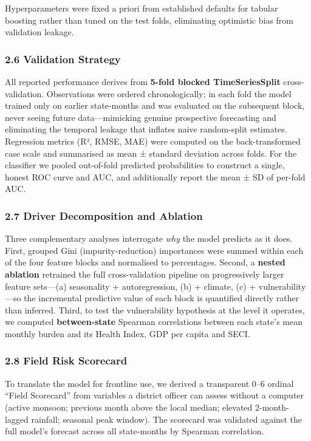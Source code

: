 \documentclass[
  10pt,
  twocolumn]{article}
\begin{document}
Hyperparameters were fixed a priori from established defaults for
tabular boosting rather than tuned on the test folds, eliminating
optimistic bias from validation leakage.

\subsubsection{2.6 Validation Strategy}\label{validation-strategy}

All reported performance derives from \textbf{5-fold blocked
TimeSeriesSplit} cross-validation. Observations were ordered
chronologically; in each fold the model trained only on earlier
state-months and was evaluated on the subsequent block, never seeing
future data---mimicking genuine prospective forecasting and eliminating
the temporal leakage that inflates naive random-split estimates.
Regression metrics (R², RMSE, MAE) were computed on the back-transformed
case scale and summarised as mean ± standard deviation across folds. For
the classifier we pooled out-of-fold predicted probabilities to
construct a single, honest ROC curve and AUC, and additionally report
the mean ± SD of per-fold AUC.

\subsubsection{2.7 Driver Decomposition and
Ablation}\label{driver-decomposition-and-ablation}

Three complementary analyses interrogate \emph{why} the model predicts
as it does. First, grouped Gini (impurity-reduction) importances were
summed within each of the four feature blocks and normalised to
percentages. Second, a \textbf{nested ablation} retrained the full
cross-validation pipeline on progressively larger feature sets---(a)
seasonality + autoregression, (b) + climate, (c) + vulnerability---so
the incremental predictive value of each block is quantified directly
rather than inferred. Third, to test the vulnerability hypothesis at the
level it operates, we computed \textbf{between-state} Spearman
correlations between each state's mean monthly burden and its Health
Index, GDP per capita and SECI.

\subsubsection{2.8 Field Risk Scorecard}\label{field-risk-scorecard}

To translate the model for frontline use, we derived a transparent 0--6
ordinal ``Field Scorecard'' from variables a district officer can assess
without a computer (active monsoon; previous month above the local
median; elevated 2-month-lagged rainfall; seasonal peak window). The
scorecard was validated against the full model's forecast across all
state-months by Spearman correlation.
\end{document}
